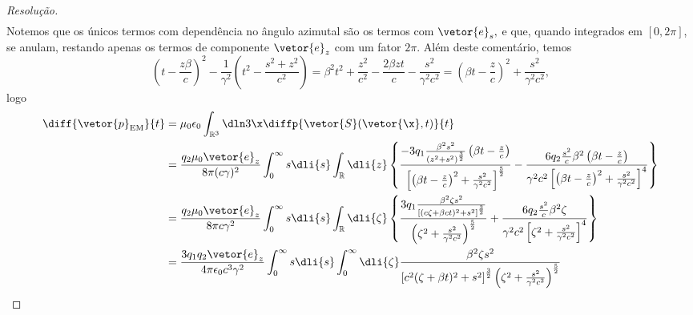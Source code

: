 \begin{proof}[Resolução]
\begin{align*}
   \end{align*}
   Notemos que os únicos termos com dependência no ângulo azimutal são os termos com \(\vetor{e}_s,\) e que, quando integrados em \([0,2\pi]\), se anulam, restando apenas os termos de componente \(\vetor{e}_z\) com um fator \(2\pi\). Além deste comentário, temos
   \begin{equation*}
      \left(t - \frac{z \beta}{c}\right)^2 - \frac{1}{\gamma^2} \left(t^2 - \frac{s^2 + z^2}{c^2}\right) = \beta^2 t^2 + \frac{z^2}{c^2} - \frac{2 \beta z t}{c} - \frac{s^2}{\gamma^2 c^2} = \left(\beta t - \frac{z}{c}\right)^2 + \frac{s^2}{\gamma^2 c^2},
   \end{equation*}
   logo
   \begin{align*}
      \diff{\vetor{p}_\mathrm{EM}}{t} 
      &= \mu_0 \epsilon_0 \int_{\mathbb{R}^3} \dln3\x \diffp{\vetor{S}(\vetor{\x}, t)}{t}\\
      &= \frac{q_2 \mu_0 \vetor{e}_z}{8\pi (c \gamma)^2} \int_{0}^{\infty} s \dli{s} \int_{\mathbb{R}} \dli{z} \left\{
      \frac{-3q_1 \frac{\beta^2 s^2}{(z^2 + s^2)^{\frac32}} \left(\beta t - \frac{z}{c}\right)}{\left[\left(\beta t - \frac{z}{c}\right)^2+ \frac{s^2}{\gamma^2c^2}\right]^{\frac52}}
         -\frac{6q_2 \frac{s^2}{c} \beta^2\left(\beta t - \frac{z}{c}\right)}{\gamma^2 c^2\left[\left(\beta t - \frac{z}{c}\right)^2+ \frac{s^2}{\gamma^2c^2}\right]^{4}} \right\}\\
      &= \frac{q_2 \mu_0 \vetor{e}_z}{8\pi c\gamma^2} \int_{0}^{\infty} s \dli{s} \int_{\mathbb{R}} \dli{\zeta} \left\{
      \frac{3q_1 \frac{\beta^2 \zeta s^2}{[(c\zeta + \beta c t)^2 + s^2]^{\frac32}}}{\left(\zeta^2+ \frac{s^2}{\gamma^2c^2}\right)^{\frac52}}
         +\frac{6q_2 \frac{s^2}{c} \beta^2 \zeta }{\gamma^2 c^2\left[\zeta^2+ \frac{s^2}{\gamma^2c^2}\right]^{4}} \right\}\\
      &= \frac{3 q_1 q_2 \vetor{e}_z}{4\pi \epsilon_0 c^3\gamma^2} \int_{0}^{\infty} s \dli{s} \int_{0}^{\infty} \dli{\zeta} \frac{\beta^2 \zeta s^2}{\left[c^2(\zeta + \beta t)^2 + s^2\right]^{\frac32} \left(\zeta^2 + \frac{s^2}{\gamma^2 c^2}\right)^{\frac52}}
   \end{align*}
\end{proof}
